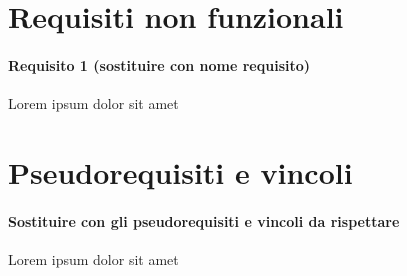 \section{Requisiti non funzionali}

\paragraph{Requisito 1 (sostituire con nome requisito) \\} 
Lorem ipsum dolor sit amet

\section{Pseudorequisiti e vincoli}
\paragraph{Sostituire con gli pseudorequisiti e vincoli da rispettare \\}
Lorem ipsum dolor sit amet

\clearpage

